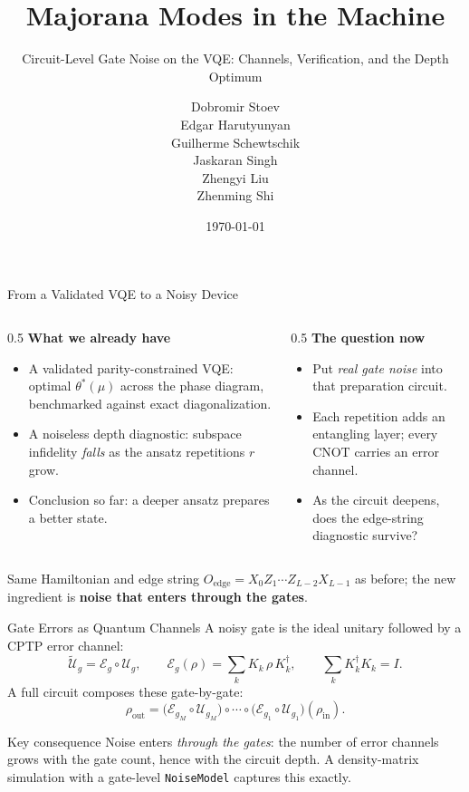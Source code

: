 \documentclass[aspectratio=169,12pt]{beamer}
\title[Kitaev Chain -- Block 4]{Majorana Modes in the Machine}
\subtitle{Circuit-Level Gate Noise on the VQE: Channels, Verification, and the Depth Optimum}
\author{Dobromir Stoev\\ Edgar Harutyunyan\\ Guilherme Schewtschik\\ Jaskaran Singh\\ Zhengyi Liu\\ Zhenming Shi}
\institute{Advanced Seminar -- AI-Augmented Theoretical Physics}
\date{\today}
\newcommand{\Oedge}{X_0Z_1\cdots Z_{L-2}X_{L-1}}
\newcommand{\E}{\mathcal{E}}
\newcommand{\U}{\mathcal{U}}
\begin{document}
\begin{frame}
 \titlepage
\end{frame}

\begin{frame}{From a Validated VQE to a Noisy Device}
  \begin{columns}[T]
    \begin{column}{0.5\textwidth}
      \small
      \textbf{What we already have}
      \begin{itemize}
        \item A validated parity-constrained VQE: optimal $\theta^*(\mu)$ across the phase diagram, benchmarked against exact diagonalization.
        \item A noiseless depth diagnostic: subspace infidelity \emph{falls} as the ansatz repetitions $r$ grow.
        \item Conclusion so far: a deeper ansatz prepares a better state.
      \end{itemize}
    \end{column}
    \begin{column}{0.5\textwidth}
      \small
      \textbf{The question now}
      \begin{itemize}
        \item Put \emph{real gate noise} into that preparation circuit.
        \item Each repetition adds an entangling layer; every CNOT carries an error channel.
        \item As the circuit deepens, does the edge-string diagnostic survive?
      \end{itemize}
    \end{column}
  \end{columns}

  \vspace{0.2cm}
  {\centering\small
  Same Hamiltonian and edge string $O_{\mathrm{edge}}=\Oedge$ as before; the new ingredient is \textbf{noise that enters through the gates}.\par}
\end{frame}

\begin{frame}{Gate Errors as Quantum Channels}
  A noisy gate is the ideal unitary followed by a CPTP error channel:
  \begin{equation}
    \tilde{\U}_g = \E_g \circ \U_g,
    \qquad
    \E_g(\rho)=\sum_k K_k\,\rho\,K_k^\dagger,
    \qquad
    \sum_k K_k^\dagger K_k = I.
  \end{equation}
  A full circuit composes these gate-by-gate:
  \begin{equation}
    \rho_{\mathrm{out}}
    = \bigl(\E_{g_M}\!\circ\U_{g_M}\bigr)\circ\cdots\circ\bigl(\E_{g_1}\!\circ\U_{g_1}\bigr)(\rho_{\mathrm{in}}).
  \end{equation}

  \begin{alertblock}{Key consequence}
    Noise enters \emph{through the gates}: the number of error channels grows with the gate count, hence with the circuit depth. A density-matrix simulation with a gate-level \texttt{NoiseModel} captures this exactly.
  \end{alertblock}
\end{frame}
\end{document}
